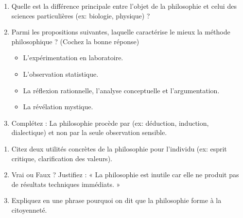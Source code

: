 \documentclass[11pt]{article}
\begin{document}
\begin{exercice}
\begin{enumerate}
    \item Quelle est la différence principale entre l'objet de la philosophie et celui des sciences particulières (ex: biologie, physique) ?
    \item Parmi les propositions suivantes, laquelle caractérise le mieux la méthode philosophique ? (Cochez la bonne réponse)
    \begin{itemize}
        \item [$\square$] L'expérimentation en laboratoire.
        \item [$\square$] L'observation statistique.
        \item [$\square$] La réflexion rationnelle, l'analyse conceptuelle et l'argumentation.
        \item [$\square$] La révélation mystique.
    \end{itemize}
    \item Complétez : La philosophie procède par \underline{\hspace{3cm}} (ex: déduction, induction, dialectique) et non par la seule observation sensible.
\end{enumerate}
\end{exercice}

\begin{exercice}
\begin{enumerate}
    \item Citez deux utilités concrètes de la philosophie pour l'individu (ex: esprit critique, clarification des valeurs).
    \item Vrai ou Faux ? Justifiez : « La philosophie est inutile car elle ne produit pas de résultats techniques immédiats. »
    \item Expliquez en une phrase pourquoi on dit que la philosophie forme à la citoyenneté.
\end{enumerate}
\end{exercice}
\end{document}

